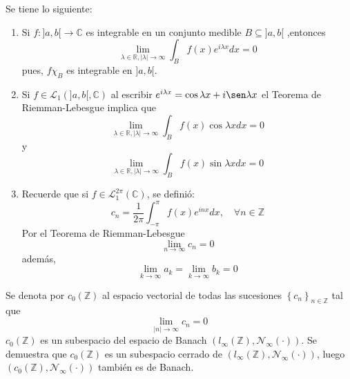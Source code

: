 \documentclass[12pt]{report}
\newcounter{it}
\theoremstyle{largebreak}
\newcommand\cf[3]{\ensuremath{#1:#2\rightarrow#3}}
\newcommand{\N}[2]{\ensuremath{\mathcal{N}_{#1}\left(#2\right)}}
\begin{document}
    \begin{obs}
        Se tiene lo siguiente:
        \begin{enumerate}
            \item Si $\cf{f}{]a,b[}{\mathbb{C}}$ es integrable en un conjunto medible $B\subseteq ]a,b[$ ,entonces
            \begin{equation*}
                \lim_{\lambda\in\mathbb{R},|\lambda|\rightarrow\infty }\int_Bf(x)e^{ i\lambda x}dx=0
            \end{equation*}
            pues, $f\chi_B$ es integrable en $]a,b[$.
            \item Si $f\in\mathcal{L}_1(]a,b[,\mathbb{C})$ al escribir $e^{ i\lambda x}=\cos \lambda x+i\sen \lambda x$ el Teorema de Riemman-Lebesgue implica que
            \begin{equation*}
                \lim_{\lambda\in\mathbb{R},|\lambda|\rightarrow\infty }\int_Bf(x)\cos \lambda x dx=0
            \end{equation*}
            y
            \begin{equation*}
                \lim_{\lambda\in\mathbb{R},|\lambda|\rightarrow\infty }\int_Bf(x)\sin \lambda x dx=0
            \end{equation*}
            \item Recuerde que si $f\in\mathcal{L}_1^{2\pi}(\mathbb{C})$, se definió:
            \begin{equation*}
                c_n=\frac{1}{2\pi}\int_{-\pi}^\pi f(x)e^{ inx}dx,\quad\forall n\in\mathbb{Z}
            \end{equation*}
            Por el Teorema de Riemman-Lebesgue
            \begin{equation*}
                \lim_{ n\rightarrow\infty}c_n=0
            \end{equation*}
            además,
            \begin{equation*}
                \lim_{ k\rightarrow\infty}a_k=\lim_{ k\rightarrow\infty}b_k=0
            \end{equation*}
        \end{enumerate}
    \end{obs}

    Se denota por $c_0(\mathbb{Z})$ al espacio vectorial de todas las sucesiones $\left\{c_n \right\}_{ n\in\mathbb{Z}}$ tal que
    \begin{equation*}
        \lim_{|n| \rightarrow\infty}c_n=0
    \end{equation*}
    $c_0(\mathbb{Z})$ es un subespacio del espacio de Banach $(l_\infty(\mathbb{Z}),\N{\infty}{\cdot})$. Se demuestra que $c_0(\mathbb{Z})$ es un subespacio cerrado de $(l_\infty(\mathbb{Z}),\N{\infty}{\cdot})$, luego $(c_0(\mathbb{Z}),\N{\infty}{\cdot})$ también es de Banach.
\end{document}
